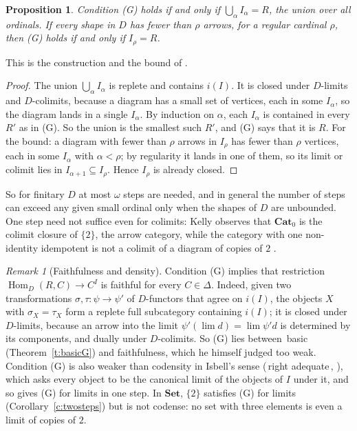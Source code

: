 \documentclass[11pt,a4paper]{amsart}
\newtheorem{proposition}[theorem]{Proposition}
\theoremstyle{definition}
\theoremstyle{remark}
\newtheorem{remark}[theorem]{Remark}
\newcommand{\q}[1]{\guillemotleft\,#1\,\guillemotright}
\newcommand{\Set}{\mathbf{Set}}
\newcommand{\Cat}{\mathbf{Cat}}
\newcommand{\Hom}{\operatorname{Hom}}
\begin{document}
\begin{proposition}\label{p:sat}
Condition (G) holds if and only if $\bigcup_{\alpha}I_\alpha=R$, the union over all ordinals. If every shape in $D$ has fewer than $\rho$ arrows, for a regular cardinal $\rho$, then (G) holds if and only if $I_\rho=R$.
\end{proposition}

This is the construction and the bound of \cite[\S3.5]{kellybook}.

\begin{proof}
The union $\bigcup_\alpha I_\alpha$ is replete and contains $i(I)$. It is closed under $D$-limits and $D$-colimits, because a diagram has a small set of vertices, each in some $I_\alpha$, so the diagram lands in a single $I_\alpha$. By induction on $\alpha$, each $I_\alpha$ is contained in every $R'$ as in (G). So the union is the smallest such $R'$, and (G) says that it is $R$. For the bound: a diagram with fewer than $\rho$ arrows in $I_\rho$ has fewer than $\rho$ vertices, each in some $I_\alpha$ with $\alpha<\rho$; by regularity it lands in one of them, so its limit or colimit lies in $I_{\alpha+1}\subseteq I_\rho$. Hence $I_\rho$ is already closed.
\end{proof}

So for finitary $D$ at most $\omega$ steps are needed, and in general the number of steps can exceed any given small ordinal only when the shapes of $D$ are unbounded. One step need not suffice even for colimits: Kelly observes that $\Cat_0$ is the colimit closure of $\{2\}$, the arrow category, while the category with one non-identity idempotent is not a colimit of a diagram of copies of $2$ \cite[end of \S5.9]{kellybook}.

\begin{remark}[Faithfulness and density]\label{r:faith}
Condition (G) implies that restriction $\Hom_D(R,C)\to C^I$ is faithful for every $C\in\Delta$. Indeed, given two transformations $\sigma,\tau\colon\psi\to\psi'$ of $D$-functors that agree on $i(I)$, the objects $X$ with $\sigma_X=\tau_X$ form a replete full subcategory containing $i(I)$; it is closed under $D$-limits, because an arrow into the limit $\psi'(\lim d)=\lim\psi' d$ is determined by its components, and dually under $D$-colimits. So (G) lies between \q{basic} (Theorem~\ref{t:basicG}) and faithfulness, which he himself judged too weak. Condition (G) is also weaker than codensity in Isbell's sense \cite{isbell} (\q{right adequate}, \cite[\S5.1]{kellybook}), which asks every object to be the canonical limit of the objects of $I$ under it, and so gives (G) for limits in one step. In $\Set$, $\{2\}$ satisfies (G) for limits (Corollary~\ref{c:twosteps}) but is not codense: no set with three elements is even a limit of copies of $2$.
\end{remark}
\end{document}
